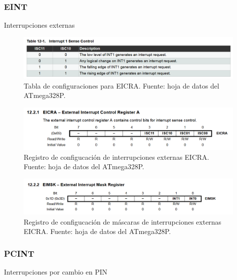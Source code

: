   \subsubsection{EINT}
    Interrupciones externas 

    \begin{figure}[H]
    \centering
    \includegraphics[width=\linewidth]{./Anexos/Marco Teorico/External Interrupts/EICRA table.png}
    \caption{Tabla de configuraciones para EICRA. Fuente: hoja de datos del ATmega328P\@\cite{atmega328p_datasheet}.}
    \label{fig:EICRA-table}
    \end{figure}

    \begin{figure}[H]
    \centering
    \includegraphics[width=\linewidth]{./Anexos/Marco Teorico/External Interrupts/EICRA.png}
    \caption{Registro de configucación de interrupciones externas EICRA. Fuente: hoja de datos del ATmega328P\@\cite{atmega328p_datasheet}.}
    \label{fig:EICRA}
    \end{figure}

    \begin{figure}[H]
    \centering
    \includegraphics[width=\linewidth]{./Anexos/Marco Teorico/External Interrupts/EIMSK.png}
    \caption{Registro de configucación de máscaras de interrupciones externas EICRA. Fuente: hoja de datos del ATmega328P\@\cite{atmega328p_datasheet}.}
    \label{fig:EIMSK}
    \end{figure}

    \subsubsection{PCINT}
    Interrupciones por cambio en PIN


